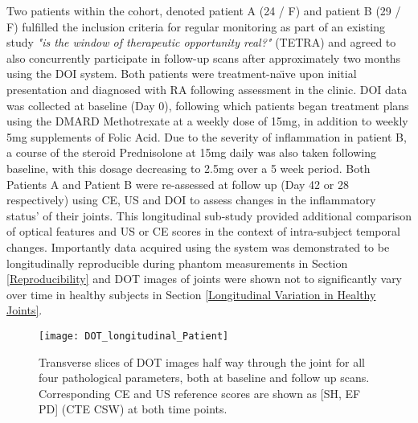 \documentclass[twoside]{bhamthesis}
\theoremstyle{definition}
\begin{document}
Two patients within the cohort, denoted patient A (24 / F) and patient B (29 / F) fulfilled the inclusion criteria for regular monitoring as part of an existing study \textit{"is the window of therapeutic opportunity real?"} (TETRA) and agreed to also concurrently participate in follow-up scans after approximately two months using the DOI system. Both patients were treatment-na\"{\i}ve upon initial presentation and diagnosed with RA following assessment in the clinic. DOI data was collected at baseline (Day 0), following which patients began treatment plans using the DMARD Methotrexate at a weekly dose of 15mg, in addition to weekly 5mg supplements of Folic Acid. Due to the severity of inflammation in patient B, a course of the steroid Prednisolone at 15mg daily was also taken following baseline, with this dosage decreasing to 2.5mg over a 5 week period. Both Patients A and Patient B were re-assessed at follow up (Day 42 or 28 respectively) using CE, US and DOI to assess changes in the inflammatory status' of their joints. This longitudinal sub-study provided additional comparison of optical features and US or CE scores in the context of intra-subject temporal changes. Importantly data acquired using the system was demonstrated to be longitudinally reproducible during phantom measurements in Section \ref{Reproducibility} and DOT images of joints were shown not to significantly vary over time in healthy subjects in Section \ref{Longitudinal Variation in Healthy Joints}.

\begin{figure}[!ht]
\centering\texttt{[image: DOT\_longitudinal\_Patient]}\caption{Transverse slices of DOT images half way through the joint for all four pathological parameters, both at baseline and follow up scans. Corresponding CE and US reference scores are shown as [SH, EF PD] (CTE CSW) at both time points.}
\label{DOT_longitudinal_Patient}
\end{figure}
\end{document}
